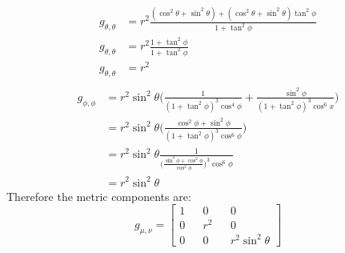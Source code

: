 \documentclass[a4paper]{article}
\begin{document}
\begin{enumerate}
\[\begin{align*}
      g_{\theta,\theta}&=
      r^2 \frac{(\cos^2\theta+\sin^2\theta)+(\cos^2\theta+\sin^2\theta)\tan^2\phi}{1+\tan^2\phi}\\
      g_{\theta,\theta}&=
      r^2 \frac{1+\tan^2\phi}{1+\tan^2\phi}\\
      g_{\theta,\theta}&= r^2 \\
    \end{align*}
  \]
  \[
    \begin{align*}
      g_{\phi,\phi}&= r^2\sin^2\theta\Bigg(\frac{1}{(1+\tan^2\phi)^{3}\cos^4\phi} +
      \frac{\sin^2\phi}{(1+\tan^2\phi)^3\cos^6x}\Bigg)\\
      &=r^2\sin^2\theta\Bigg(\frac{\cos^2\phi+\sin^2\phi}{(1+\tan^2\phi)^3\cos^6\phi}\Bigg)\\
      &=r^2\sin^2\theta\frac{1}{\big(\frac{\sin^2\phi+\cos^2\phi}{\cos^2\phi}\big)^3\cos^6\phi}\\
      &=r^2\sin^2\theta
    \end{align*}
  \]
  Therefore the metric components are:
  \[
    g_{\mu, \nu} =
    \begin{bmatrix}
      1 && 0 && 0 \\
      0 && r^2 && 0 \\
      0 && 0 && r^2\sin^2\theta
    \end{bmatrix}
  \] 
  \end{enumerate}
\end{document}
